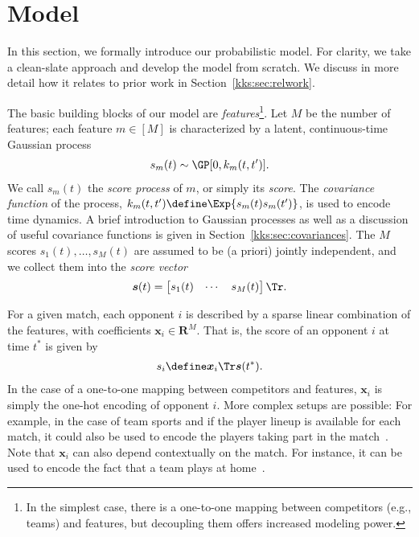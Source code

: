 \section{Model}
\label{kks:sec:model}

In this section, we formally introduce our probabilistic model.
For clarity, we take a clean-slate approach and develop the model from scratch.
We discuss in more detail how it relates to prior work in Section~\ref{kks:sec:relwork}.

The basic building blocks of our model are \emph{features}\footnote{%
	In the simplest case, there is a one-to-one mapping between competitors (e.g., teams) and features, but decoupling them offers increased modeling power.}.
Let $M$ be the number of features; each feature $m \in [M]$ is characterized by a latent, continuous-time Gaussian process
\begin{align}
	\label{kks:eq:score}
	s_m(t) \sim \GP[0, k_m(t, t')].
\end{align}
We call $s_m(t)$ the \emph{score process} of $m$, or simply its \emph{score}.
The \emph{covariance function} of the process, $k_m(t, t') \define \Exp{s_m(t) s_m(t')}$, is used to encode time dynamics.
A brief introduction to Gaussian processes as well as a discussion of useful covariance functions is given in Section~\ref{kks:sec:covariances}.
The $M$ scores $s_1(t), \dots, s_M(t)$ are assumed to be (a priori) jointly independent, and we collect them into the \emph{score vector}
\begin{align*}
	\bm{s}(t) = \begin{bmatrix}s_1(t) & \cdots & s_M(t) \end{bmatrix}\Tr.
\end{align*}

For a given match, each opponent $i$ is described by a sparse linear combination of the features, with coefficients $\bm{x}_i \in \mathbf{R}^M$.
That is, the score of an opponent $i$ at time $t^*$ is given by
\begin{align}
	\label{kks:eq:compscore}
	s_i \define \bm{x}_i\Tr \bm{s}(t^*).
\end{align}
In the case of a one-to-one mapping between competitors and features, $\bm{x}_i$ is simply the one-hot encoding of opponent $i$.
More complex setups are possible: For example, in the case of team sports and if the player lineup is available for each match, it could also be used to encode the players taking part in the match~\citep{maystre2016player}.
Note that $\bm{x}_i$ can also depend contextually on the match.
For instance, it can be used to encode the fact that a team plays at home~\citep{agresti2012categorical}.

